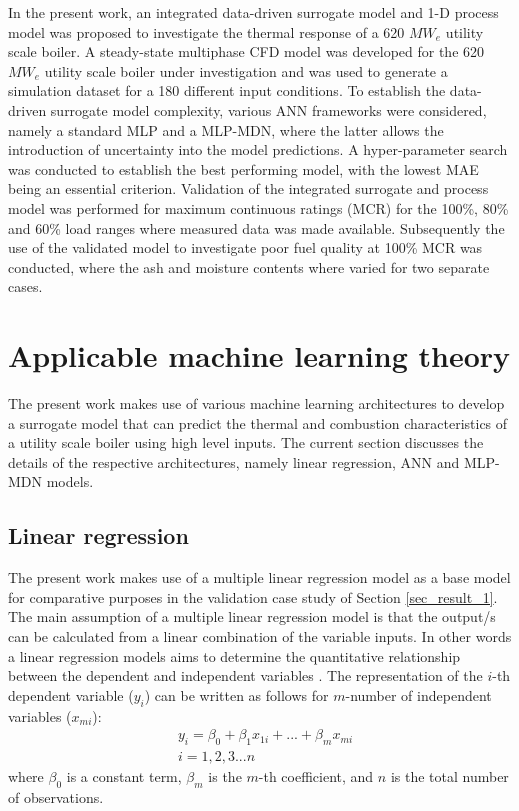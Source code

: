 \documentclass[a4paper,fleqn]{cas-sc}
\begin{document}
In the present work, an integrated data-driven surrogate model and 1-D process model was proposed to investigate the thermal response of a 620 $MW_e$ utility scale boiler. A steady-state multiphase CFD model was developed for the 620 $MW_e$ utility scale boiler under investigation and was used to generate a simulation dataset for a 180 different input conditions. To establish the data-driven surrogate model complexity, various ANN frameworks were considered, namely a standard MLP and a MLP-MDN, where the latter allows the introduction of uncertainty into the model predictions. A hyper-parameter search was conducted to establish the best performing model, with the lowest MAE being an essential criterion. Validation of the integrated surrogate and process model was performed for maximum continuous ratings (MCR) for the 100\%, 80\% and 60\% load ranges where measured data was made available. Subsequently the use of the validated model to investigate poor fuel quality at 100\% MCR was conducted, where the ash and moisture contents where varied for two separate cases.

\section{Applicable machine learning theory}
The present work makes use of various machine learning architectures to develop a surrogate model that can predict the thermal and combustion characteristics of a utility scale boiler using high level inputs. The current section discusses the details of the respective architectures, namely linear regression, ANN and MLP-MDN models.  
\subsection{Linear regression}
The present work makes use of a multiple linear regression model as a base model for comparative purposes in the validation case study of Section \ref{sec_result_1}. The main assumption of a multiple linear regression model is that the output/s can be calculated from a linear combination of the variable inputs. In other words a linear regression models aims to determine the quantitative relationship between the dependent and independent variables \cite{Wen2022}. The representation of the $i$-th dependent variable ($y_i$) can be written as follows for $m$-number of independent variables ($x_{mi}$):
\begin{equation}
\begin{split}
&y_i = \beta_0+\beta_1x_{1i}+...+\beta_mx_{mi}\\
&i = 1,2,3...n
\end{split}
\end{equation}
where $\beta_0$ is a constant term, $\beta_{m}$ is the $m$-th coefficient, and $n$ is the total number of observations.\\
 
\end{document}
